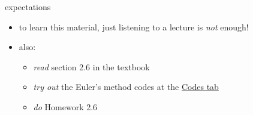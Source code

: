\documentclass[colorlinks]{beamer}
\begin{document}
\begin{frame}{expectations}

\begin{itemize}
\item to learn this material, just listening to a lecture is \emph{not} enough!

\item also:
     \begin{itemize}
     \item \emph{read} section 2.6 in the textbook
     \item \emph{try out} the Euler's method codes at the \href{https://bueler.github.io/math302/codes.html}{Codes tab}
     \item \emph{do} Homework 2.6
     \end{itemize}
\end{itemize}
\end{frame}
\end{document}
